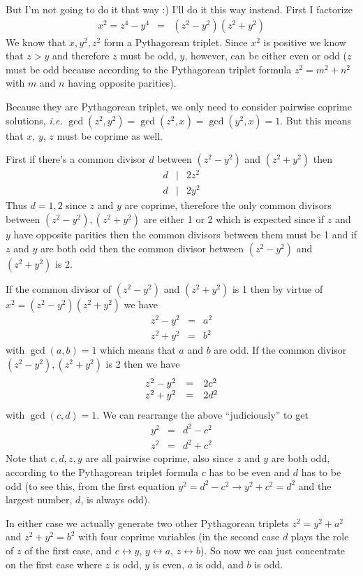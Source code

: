 \documentclass[aps,preprint,preprintnumbers,nofootinbib,showpacs,prd]{revtex4-1}
\newcommand{\ie}{{\it i.e.} }
\newcommand{\nbea}{\begin{eqnarray*}}
\newcommand{\neea}{\end{eqnarray*}}
\begin{document}
But I'm not going to do it that way :) I'll do it this way instead. First I factorize
%
\nbea
x^2 = z^4 - y^4 & = & (z^2 - y^2)(z^2 + y^2)
\neea
%
We know that $x,y^2,z^2$ form a Pythagorean triplet. Since $x^2$ is positive we know that $z > y$ and therefore $z$ must be odd, $y$, however, can be either even or odd ($z$ must be odd because according to the Pythagorean triplet formula $z^2 = m^2 + n^2$ with $m$ and $n$ having opposite parities).

Because they are Pythagorean triplet, we only need to consider pairwise coprime solutions, \ie $\gcd(z^2,y^2)=\gcd(z^2,x)=\gcd(y^2,x)=1$. But this means that $x$, $y$, $z$ must be coprime as well.

First if there's a common divisor $d$ between $(z^2 - y^2)$ and $(z^2 + y^2)$ then
%
\nbea
d &|& 2z^2 \\
d &|& 2y^2
\neea
%
Thus $d=1,2$ since $z$ and $y$ are coprime, therefore the only common divisors between $(z^2 - y^2),(z^2 + y^2)$ are either 1 or 2 which is expected since if $z$ and $y$ have opposite parities then the common divisors between them must be 1 and if $z$ and $y$ are both odd then the common divisor between $(z^2 - y^2)$ and $(z^2 + y^2)$ is 2.

If the common divisor of $(z^2 - y^2)$ and $(z^2 + y^2)$ is 1 then by virtue of $x^2 = (z^2 - y^2)(z^2 + y^2)$ we have
%
\nbea
z^2 - y^2 & = & a^2 \\
z^2 + y^2 & = & b^2
\neea
%
with $\gcd(a,b) = 1$ which means that $a$ and $b$ are odd. If the common divisor $(z^2 - y^2),(z^2 + y^2)$ is 2 then we have
%
\nbea
\begin{array} {r c l}
z^2 - y^2 & = & 2c^2 \\
z^2 + y^2 & = & 2d^2
\end{array}
\neea
%
with $\gcd(c,d) = 1$. We can rearrange the above ``judiciously'' to get
%
\nbea
y^2 & = & d^2 - c^2 \\
z^2 & = & d^2 + c^2
\neea
%
Note that $c,d,z,y$ are all pairwise coprime, also since $z$ and $y$ are both odd, according to the Pythagorean triplet formula $c$ has to be even and $d$ has to be odd (to see this, from the first equation $y^2 = d^2 - c^2 \to y^2  + c^2= d^2$ and the largest number, $d$, is always odd).

In either case we actually generate two other Pythagorean triplets $z^2 = y^2 + a^2$ and $z^2 + y^2 = b^2$ with four coprime variables (in the second case $d$ plays the role of $z$ of the first case, and $c \leftrightarrow y$, $y \leftrightarrow a$, $z \leftrightarrow b$). So now we can just concentrate on the first case where $z$ is odd, $y$ is even, $a$ is odd, and $b$ is odd.
\end{document}
